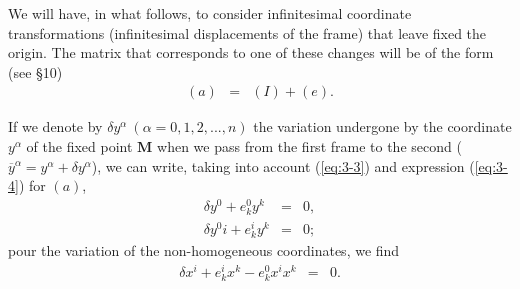We will have, in what follows, to consider infinitesimal coordinate transformations (infinitesimal displacements of the frame) that leave fixed the origin. The matrix that corresponds to one of these changes will be of the form (see \S 10)
\begin{eqnarray}
(a) &=& (I) + (e).
\label{eq:3-4}
\end{eqnarray}

If we denote by $\delta y^\alpha\ (\alpha=0,1,2,...,n)$ the variation undergone by the coordinate $y^\alpha$ of the fixed point $\bm M$ when we pass from the first frame to the second ($\overline y^\alpha = y^\alpha + \delta y^\alpha$), we can write, taking into account  (\ref{eq:3-3}) and expression (\ref{eq:3-4}) for $(a)$,
\begin{eqnarray*}
\delta y^0 + e^0_k y^k &=& 0, \\
\delta y^0i+ e^i_k y^k &=& 0 ; 
\end{eqnarray*}
pour the variation of the non-homogeneous coordinates, we find 
\begin{eqnarray*}
\delta x^i + e^i_k x^k - e^0_k x^i x^k &=& 0 . 
\end{eqnarray*}

